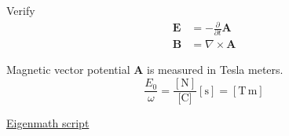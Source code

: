 Verify
\begin{align*}
\mathbf E&=-\frac{\partial}{\partial t}\mathbf A
\\
\mathbf B&=\nabla\times\mathbf A
\end{align*}

Magnetic vector potential $\mathbf A$ is measured in Tesla meters.
\begin{equation*}
\frac{E_0}{\omega}=\frac{[\text{N}]}{\text{[C]}}[\text{s}]=[\text{T}\,\text{m}]
\end{equation*}

\href{https://georgeweigt.github.io/examples/maxwell-equations-demo.html}{Eigenmath script}



